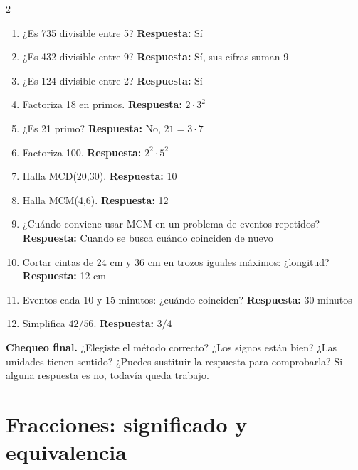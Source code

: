 \documentclass[10pt,oneside,openany]{book}
\begin{document}
\begin{multicols}{2}\begin{enumerate}

\item ¿Es 735 divisible entre 5? \textbf{Respuesta:} Sí

\item ¿Es 432 divisible entre 9? \textbf{Respuesta:} Sí, sus cifras suman 9

\item ¿Es 124 divisible entre 2? \textbf{Respuesta:} Sí

\item Factoriza 18 en primos. \textbf{Respuesta:} $2\cdot3^2$

\item ¿Es 21 primo? \textbf{Respuesta:} No, $21=3\cdot7$

\item Factoriza 100. \textbf{Respuesta:} $2^2\cdot5^2$

\item Halla MCD(20,30). \textbf{Respuesta:} 10

\item Halla MCM(4,6). \textbf{Respuesta:} 12

\item ¿Cuándo conviene usar MCM en un problema de eventos repetidos? \textbf{Respuesta:} Cuando se busca cuándo coinciden de nuevo

\item Cortar cintas de 24 cm y 36 cm en trozos iguales máximos: ¿longitud? \textbf{Respuesta:} 12 cm

\item Eventos cada 10 y 15 minutos: ¿cuándo coinciden? \textbf{Respuesta:} 30 minutos

\item Simplifica $42/56$. \textbf{Respuesta:} $3/4$

\end{enumerate}\end{multicols}

\begin{idea}\textbf{Chequeo final.} ¿Elegiste el método correcto? ¿Los signos están bien? ¿Las unidades tienen sentido? ¿Puedes sustituir la respuesta para comprobarla? Si alguna respuesta es no, todavía queda trabajo.\end{idea}



\chapter{Fracciones: significado y equivalencia}
\end{document}
